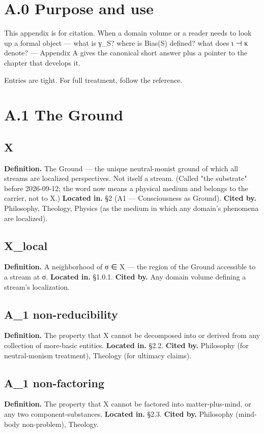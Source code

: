 \documentclass[11pt, openany]{book}
\newcommand{\sectionbreak}{\clearpage}
\begin{document}
\sectionbreak

\section{A.0 Purpose and use}

This appendix is for citation. When a domain volume or a reader needs to look up a formal object --- what is γ\_\allowbreak{}S? where is Bias(S) defined? what does ι ⊣ κ denote? --- Appendix A gives the canonical short answer plus a pointer to the chapter that develops it.

Entries are tight. For full treatment, follow the reference.

\sectionbreak

\section{A.1 The Ground}

\subsection{X}
\textbf{Definition.} The Ground --- the unique neutral-monist ground of which all streams are localized perspectives. Not itself a stream. (Called "the substrate" before 2026-09-12; the word now means a physical medium and belongs to the carrier, not to X.)
\textbf{Located in.} §2 (A1 --- Consciousness as Ground).
\textbf{Cited by.} Philosophy, Theology, Physics (as the medium in which any domain's phenomena are localized).

\subsection{X\_\allowbreak{}local}
\textbf{Definition.} A neighborhood of σ ∈ X --- the region of the Ground accessible to a stream at σ.
\textbf{Located in.} §1.0.1.
\textbf{Cited by.} Any domain volume defining a stream's localization.

\subsection{A\_\allowbreak{}1 non-reducibility}
\textbf{Definition.} The property that X cannot be decomposed into or derived from any collection of more-basic entities.
\textbf{Located in.} §2.2.
\textbf{Cited by.} Philosophy (for neutral-monism treatment), Theology (for ultimacy claims).

\subsection{A\_\allowbreak{}1 non-factoring}
\textbf{Definition.} The property that X cannot be factored into matter-plus-mind, or any two component-substances.
\textbf{Located in.} §2.3.
\textbf{Cited by.} Philosophy (mind-body non-problem), Theology.
\end{document}
